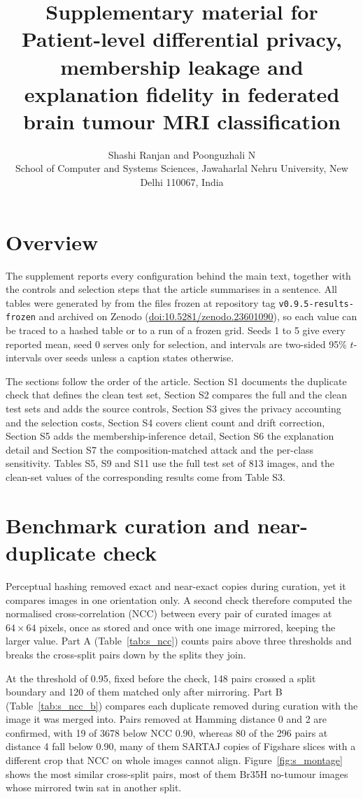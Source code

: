 \documentclass[a4paper,11pt]{article}
\title{Supplementary material for\\[2pt]\large Patient-level differential privacy, membership leakage and explanation
fidelity in federated brain tumour MRI classification}
\author{Shashi Ranjan and Poonguzhali N\\[2pt]\small School of Computer and Systems Sciences, Jawaharlal Nehru
University, New Delhi 110067, India}
\date{}
\begin{document}
\maketitle

\section*{Overview}
The supplement reports every configuration behind the main text, together with the controls and selection steps that
the article summarises in a sentence. All tables were generated by  from the files
frozen at repository tag \texttt{v0.9.5-results-frozen} and archived on Zenodo (\href{https://doi.org/10.5281/zenodo.23601090}{doi:10.5281/zenodo.23601090}), so each value can be traced to a hashed table or to a run of
a frozen grid. Seeds 1 to 5 give every reported mean, seed 0 serves only for selection, and intervals are two-sided
95\% $t$-intervals over seeds unless a caption states otherwise.

The sections follow the order of the article. Section S1 documents the duplicate check that defines the clean test set,
Section S2 compares the full and the clean test sets and adds the source controls, Section S3 gives the privacy
accounting and the selection costs, Section S4 covers client count and drift correction, Section S5 adds the
membership-inference detail, Section S6 the explanation detail and Section S7 the composition-matched attack and the
per-class sensitivity. Tables S5, S9 and S11 use the full test set of 813
images, and the clean-set values of the corresponding results come from Table S3.

\section{Benchmark curation and near-duplicate check}
Perceptual hashing removed exact and near-exact copies during curation, yet it compares images in one orientation
only. A second check therefore computed the normalised cross-correlation (NCC) between every pair of curated images at
$64\times64$ pixels, once as stored and once with one image mirrored, keeping the larger value. Part A
(Table~\ref{tab:s_ncc}) counts pairs above three thresholds and breaks the cross-split pairs down by the splits they
join.



At the threshold of 0.95, fixed before the check, 148 pairs crossed a split boundary and 120 of them matched only after
mirroring. Part B (Table~\ref{tab:s_ncc_b}) compares each duplicate removed during curation with the image it was
merged into. Pairs removed at Hamming distance 0 and 2 are confirmed, with 19 of 3678 below NCC 0.90, whereas 80 of the
296 pairs at distance 4 fall below 0.90, many of them SARTAJ copies of Figshare slices with a different crop that NCC
on whole images cannot align. Figure~\ref{fig:s_montage} shows the most similar cross-split pairs, most of them Br35H
no-tumour images whose mirrored twin sat in another split.
\end{document}
